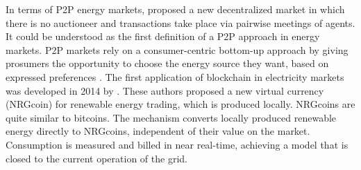 In terms of P2P energy markets, \cite{blouin2001decentralized} proposed a new decentralized market in which there is no auctioneer and transactions take place via pairwise meetings of agents. It could be understood as the first definition of a P2P approach in energy markets. P2P markets rely on a consumer-centric bottom-up approach by giving prosumers the opportunity to choose the energy source they want, based on expressed preferences \cite{sousa2018peer}. The first application of blockchain in electricity markets was developed in 2014 by \cite{mihaylov2014nrgcoin}. These authors proposed a new virtual currency (NRGcoin) for renewable energy trading, which is produced locally. NRGcoins are quite similar to bitcoins. The mechanism converts locally produced renewable energy directly to NRGcoins, independent of their value on the market. Consumption is measured and billed in near real-time, achieving a model that is closed to the current operation of the grid.
